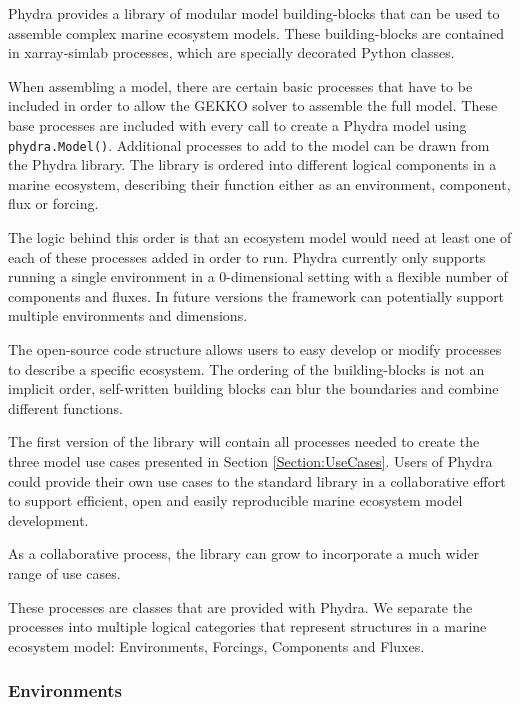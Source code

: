 \documentclass[template.tex]{subfiles}
\begin{document}
Phydra provides a library of modular model building-blocks that can be used to assemble complex marine ecosystem models. These building-blocks are contained in xarray-simlab processes, which are specially decorated Python classes.

When assembling a model, there are certain basic processes that have to be included in order to allow the GEKKO solver to assemble the full model. These base processes are included with every call to create a Phydra model using \texttt{phydra.Model()}. Additional processes to add to the model can be drawn from the Phydra library. 
The library is ordered into different logical components in a marine ecosystem, describing their function either as an environment, component, flux or forcing. 

The logic behind this order is that an ecosystem model would need at least one of each of these processes added in order to run. Phydra currently only supports running a single environment in a 0-dimensional setting with a flexible number of components and fluxes. In future versions the framework can potentially support multiple environments and dimensions.

The open-source code structure allows users to easy develop or modify processes to describe a specific ecosystem. The ordering of the building-blocks is not an implicit order, self-written building blocks can blur the boundaries and combine different functions.

The first version of the library will contain all processes needed to create the three model use cases presented in Section \ref{Section:UseCases}. Users of Phydra could provide their own use cases to the standard library in a collaborative effort to support efficient, open and easily reproducible marine ecosystem model development.

As a collaborative process, the library can grow to incorporate a much wider range of use cases.

These processes are classes that are provided with Phydra. We separate the processes into multiple logical categories that represent structures in a marine ecosystem model: Environments, Forcings, Components and Fluxes.

\subsubsection{Environments} \label{Section:PhysicalEnvironment}
\end{document}
